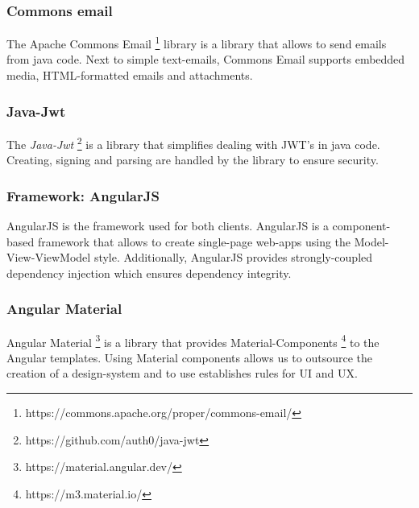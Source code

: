 \subsubsection{Commons email}\label{subsubsec:commons-email}
The Apache Commons Email \footnote{https://commons.apache.org/proper/commons-email/} library is a library that allows to send emails from java code.
Next to simple text-emails, Commons Email supports embedded media, HTML-formatted emails and attachments.

\subsubsection{Java-Jwt}
The \textit{Java-Jwt} \footnote{https://github.com/auth0/java-jwt} is a library that simplifies dealing with JWT's in java code.
Creating, signing and parsing are handled by the library to ensure security.

\subsubsection{Framework: AngularJS}
AngularJS is the framework used for both clients. \newline
AngularJS is a component-based framework that allows to create single-page web-apps using the Model-View-ViewModel style.
Additionally, AngularJS provides strongly-coupled dependency injection which ensures dependency integrity.

\subsubsection{Angular Material}
Angular Material \footnote{https://material.angular.dev/} is a library that provides Material-Components \footnote{https://m3.material.io/} to the Angular templates.
Using Material components allows us to outsource the creation of a design-system and to use establishes rules for UI and UX.